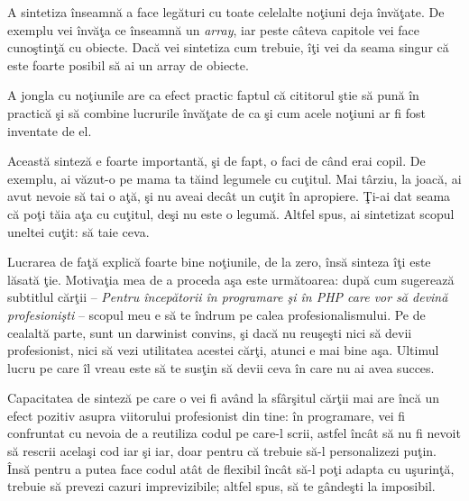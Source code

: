A sintetiza înseamnă a face legături cu toate celelalte noţiuni
deja învăţate. De exemplu vei învăţa ce înseamnă un \textsl{array}, iar peste
câteva capitole vei face cunoştinţă cu obiecte. Dacă vei sintetiza
cum trebuie, îţi vei da seama singur că este foarte posibil
să ai un array de obiecte.

A jongla cu noţiunile are ca efect practic faptul că cititorul ştie
să pună în practică şi să combine lucrurile învăţate de ca şi cum
acele noţiuni ar fi fost inventate de el.


Această sinteză e foarte importantă, şi de fapt, o faci de când erai
copil. De exemplu, ai văzut-o pe mama ta tăind legumele cu cuţitul.
Mai târziu, la joacă, ai avut nevoie să tai o aţă, şi nu aveai decât
un cuţit în apropiere. Ţi-ai dat seama că poţi tăia aţa cu cuţitul,
deşi nu este o legumă. Altfel spus, ai sintetizat scopul uneltei
{\glqq}cuţit{\grqq}: să taie ceva.

Lucrarea de faţă explică foarte bine noţiunile, de la zero, însă
sinteza îţi este lăsată ţie. Motivaţia mea de a proceda aşa este următoarea:
după cum sugerează subtitlul cărţii -- \textit{Pentru începătorii în programare şi în PHP care vor să devină profesionişti} -- scopul meu e să te îndrum pe calea profesionalismului.
Pe de cealaltă parte, sunt un darwinist convins, şi dacă nu reuşeşti
nici să devii profesionist, nici să vezi utilitatea acestei cărţi, atunci
e mai bine aşa. Ultimul lucru pe care îl vreau este să te susţin
să devii ceva în care nu ai avea succes.

Capacitatea de sinteză pe care o vei fi având la sfârşitul cărţii
mai are încă un efect pozitiv asupra viitorului profesionist din tine:
în programare, vei fi confruntat cu nevoia de a reutiliza codul pe care-l scrii, astfel
încât să nu fi nevoit să rescrii acelaşi cod iar şi iar, doar pentru
că trebuie să-l personalizezi puţin. Însă pentru a putea face
codul atât de flexibil încât să-l poţi adapta cu uşurinţă, trebuie
să prevezi cazuri {\glqq}imprevizibile{\grqq}; altfel spus, să te gândeşti
la imposibil.


